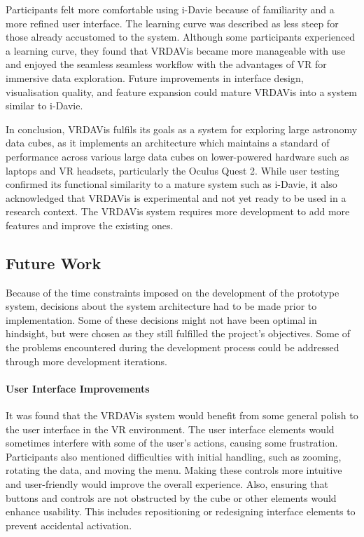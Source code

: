 Participants felt more comfortable using i-Davie because of familiarity and a more refined user interface. 
The learning curve was described as less steep for those already accustomed to the system.
Although some participants experienced a learning curve, they found that VRDAVis became more manageable with use and enjoyed the seamless seamless workflow with the advantages of VR for immersive data exploration. 
Future improvements in interface design, visualisation quality, and feature expansion could mature VRDAVis into a system similar to i-Davie.

In conclusion, VRDAVis fulfils its goals as a system for exploring large astronomy data cubes, as it implements an architecture which maintains a standard of performance across various large data cubes on lower-powered hardware such as laptops and VR headsets, particularly the Oculus Quest 2.
While user testing confirmed its functional similarity to a mature system such as i-Davie, it also acknowledged that VRDAVis is experimental and not yet ready to be used in a research context.
The VRDAVis system requires more development to add more features and improve the existing ones.

\subsection{Future Work}
Because of the time constraints imposed on the development of the prototype system, decisions about the system architecture had to be made prior to implementation.
Some of these decisions might not have been optimal in hindsight, but were chosen as they still fulfilled the project's objectives.
Some of the problems encountered during the development process could be addressed through more development iterations.

\paragraph{User Interface Improvements}
It was found that the VRDAVis system would benefit from some general polish to the user interface in the VR environment.
The user interface elements would sometimes interfere with some of the user's actions, causing some frustration.
Participants also mentioned difficulties with initial handling, such as zooming, rotating the data, and moving the menu. 
Making these controls more intuitive and user-friendly would improve the overall experience.
Also, ensuring that buttons and controls are not obstructed by the cube or other elements would enhance usability. 
This includes repositioning or redesigning interface elements to prevent accidental activation.

